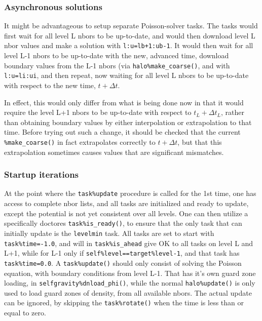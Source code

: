 \documentclass[paper=a4,fontsize=11pt]{scrartcl}
\numberwithin{equation}{section}		%
\numberwithin{figure}{section}			%
\numberwithin{table}{section}				%
\begin{document}
\subsubsection{Asynchronous solutions}
It might be advantageous to setup separate Poisson-solver tasks.  The tasks would first wait for all level L nbors to be up-to-date, and would then download level L nbor values and make a solution with \verb|l:u=lb+1:ub-1|.  It would then wait for all level L-1 nbors to be up-to-date with the new, advanced time, download boundary values from the L-1 nbors (via \verb|halo%make_coarse()|, and with \verb|l:u=li:ui|, and then repeat, now waiting for all level L nbors to be up-to-date with respect to the new time, $t+\Delta t$.

In effect, this would only differ from what is being done now in that it would require the level L+1 nbors to be up-to-date with respect to $t_L+\Delta t_L$, rather than obtaining boundary values by either interpolation or extrapolation to that time.  Before trying out such a change, it should be checked that the current \verb|%make_coarse()| in fact extrapolates correctly to $t+\Delta t$, but that this extrapolation sometimes causes values that are significant mismatches.

\subsubsection{Startup iterations}
At the point where the \verb|task%update| procedure is called for the 1st time, one has access to complete nbor lists, and all tasks are initialized and ready to update, except the potential is not yet consistent over all levels.  One can then utilize a specifically doctores \verb|task%is_ready()|, to ensure that the only task that can initially update is the \verb|levelmin| task.  All tasks are set to start with \verb|task%time=-1.0|, and will in \verb|task%is_ahead| give OK to all tasks on level L and L+1, while for L-1 only if \verb|self%level==target%level-1|, and that task has \verb|task%time=0.0|.  A \verb|task%update()| should only consist of solving the Poisson equation, with boundary conditions from level L-1.   That has it's own guard zone loading, in \verb|selfgravity%dnload_phi()|, while the normal \verb|halo%update()| is only used to load guard zones of density, from all available nbors.  The actual update can be ignored, by skipping the \verb|task%rotate()| when the time is less than or equal to zero.
\end{document}

